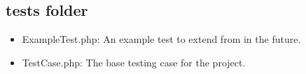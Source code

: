 
\subsection{tests folder}
\begin{itemize}
    \item ExampleTest.php: An example test to extend from in the future.
    \item TestCase.php: The base testing case for the project.
\end{itemize}